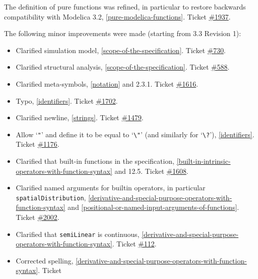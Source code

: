The definition of pure functions was refined, in particular to restore
backwards compatibility with Modelica 3.2, \cref{pure-modelica-functions}. Ticket
\href{https://github.com/modelica/ModelicaSpecification/issues/1937}{\#1937}.

The following minor improvements were made (starting from 3.3 Revision 1):
\begin{itemize}
\item
  Clarified simulation model, \cref{scope-of-the-specification}. Ticket
  \href{https://github.com/modelica/ModelicaSpecification/issues/730}{\#730}.
\item
  Clarified structural analysis, \cref{scope-of-the-specification}. Ticket
  \href{https://github.com/modelica/ModelicaSpecification/issues/588}{\#588}.
\item
  Clarified meta-symbols, \cref{notation} and 2.3.1.
  Ticket \href{https://github.com/modelica/ModelicaSpecification/issues/1616}{\#1616}.
\item
  Typo, \cref{identifiers}. Ticket
  \href{https://github.com/modelica/ModelicaSpecification/issues/1702}{\#1702}.
\item
  Clarified newline, \cref{strings}. Ticket
  \href{https://github.com/modelica/ModelicaSpecification/issues/1479}{\#1479}.
\item
  Allow `\lstinline!"!' and define it to be equal to `\lstinline!\"!' (and
  similarly for `\lstinline!\?!'), \cref{identifiers}. Ticket
  \href{https://github.com/modelica/ModelicaSpecification/issues/1176}{\#1176}.
\item
  Clarified that built-in functions in the specification, \cref{built-in-intrinsic-operators-with-function-syntax}
  and 12.5. Ticket
  \href{https://github.com/modelica/ModelicaSpecification/issues/1608}{\#1608}.
\item
  Clarified named arguments for builtin operators, in particular \lstinline!spatialDistribution!, \cref{derivative-and-special-purpose-operators-with-function-syntax} and \cref{positional-or-named-input-arguments-of-functions}.
  Ticket \href{https://github.com/modelica/ModelicaSpecification/issues/2002}{\#2002}.
\item
  Clarified that \lstinline!semiLinear! is continuous, \cref{derivative-and-special-purpose-operators-with-function-syntax}.
  Ticket \href{https://github.com/modelica/ModelicaSpecification/issues/112}{\#112}.
\item
  Corrected spelling, \cref{derivative-and-special-purpose-operators-with-function-syntax}. Ticket

\end{itemize}
